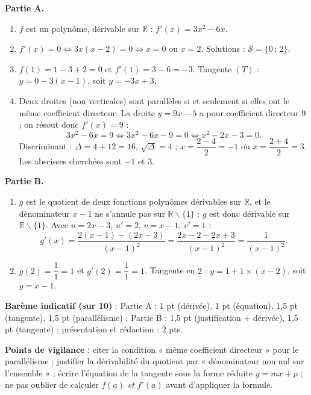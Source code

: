 \documentclass[11pt]{article}
\def\setminus{\mathbin{\backslash}}\let\smallsetminus\setminus
\begin{document}
\begin{corrige}
\textbf{Partie A.}
\begin{enumerate}
\item $f$ est un polynôme, dérivable sur $\mathbb{R}$ : $f'(x)=3x^2-6x$.
\item $f'(x)=0 \iff 3x(x-2)=0 \iff x=0$ ou $x=2$. Solutions : $\mathcal{S}=\{0\,;\,2\}$.
\item $f(1)=1-3+2=0$ et $f'(1)=3-6=-3$. Tangente $(T)$ : $y=0-3(x-1)$, soit $\boxed{y=-3x+3}$.
\item Deux droites (non verticales) sont parallèles si et seulement si elles ont le même coefficient directeur. La droite $y=9x-5$ a pour coefficient directeur $9$ ; on résout donc $f'(x)=9$ :
\[ 3x^2-6x=9 \iff 3x^2-6x-9=0 \iff x^2-2x-3=0. \]
Discriminant : $\Delta=4+12=16$, $\sqrt{\Delta}=4$ ; $x=\dfrac{2-4}{2}=-1$ ou $x=\dfrac{2+4}{2}=3$. Les abscisses cherchées sont $\boxed{-1 \text{ et } 3}$.
\end{enumerate}
\textbf{Partie B.}
\begin{enumerate}
\item $g$ est le quotient de deux fonctions polynômes dérivables sur $\mathbb{R}$, et le dénominateur $x-1$ ne s'annule pas sur $\mathbb{R}\setminus\{1\}$ : $g$ est donc dérivable sur $\mathbb{R}\setminus\{1\}$. Avec $u=2x-3$, $u'=2$, $v=x-1$, $v'=1$ :
\[ g'(x)=\frac{2(x-1)-(2x-3)}{(x-1)^2}=\frac{2x-2-2x+3}{(x-1)^2}=\frac{1}{(x-1)^2}. \]
\item $g(2)=\dfrac{1}{1}=1$ et $g'(2)=\dfrac{1}{1}=1$. Tangente en $2$ : $y=1+1\times(x-2)$, soit $\boxed{y=x-1}$.
\end{enumerate}
\textbf{Barème indicatif (sur 10)} : Partie A : 1 pt (dérivée), 1 pt (équation), 1,5 pt (tangente), 1,5 pt (parallélisme) ; Partie B : 1,5 pt (justification + dérivée), 1,5 pt (tangente) ; présentation et rédaction : 2 pts.

\textbf{Points de vigilance} : citer la condition « même coefficient directeur » pour le parallélisme ; justifier la dérivabilité du quotient par « dénominateur non nul sur l'ensemble » ; écrire l'équation de la tangente sous la forme réduite $y=mx+p$ ; ne pas oublier de calculer $f(a)$ \emph{et} $f'(a)$ avant d'appliquer la formule.
\end{corrige}
\end{document}
